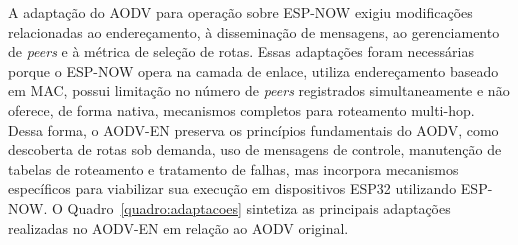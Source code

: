 A adaptação do AODV para operação
sobre ESP-NOW exigiu modificações relacionadas ao endereçamento, à
disseminação de mensagens, ao gerenciamento de \emph{peers} e à métrica de
seleção de rotas. Essas adaptações foram necessárias porque o ESP-NOW
opera na camada de enlace, utiliza endereçamento baseado em MAC, possui
limitação no número de \emph{peers} registrados simultaneamente e não oferece,
de forma nativa, mecanismos completos para roteamento multi-hop. Dessa
forma, o AODV-EN preserva os princípios fundamentais do AODV, como
descoberta de rotas sob demanda, uso de mensagens de controle,
manutenção de tabelas de roteamento e tratamento de falhas, mas
incorpora mecanismos específicos para viabilizar sua execução em
dispositivos ESP32 utilizando ESP-NOW. O Quadro~\ref{quadro:adaptacoes} sintetiza as
principais adaptações realizadas no AODV-EN em relação ao AODV original.
